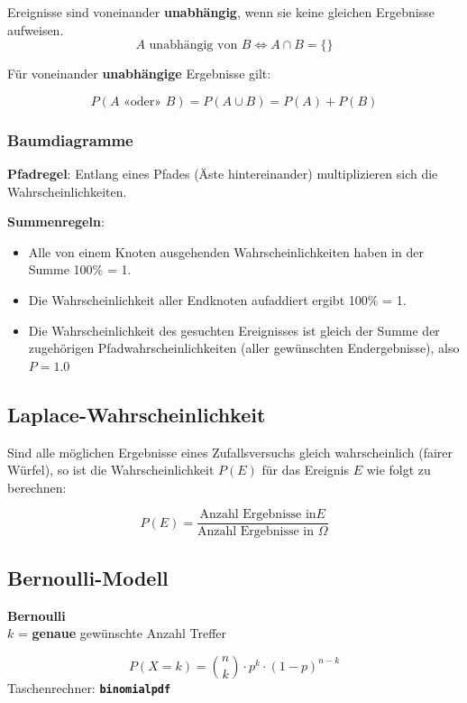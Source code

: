 \begin{multicols}{2}
Ereignisse sind voneinander \textbf{unabhängig}, wenn sie keine
gleichen Ergebnisse aufweisen.
$$A \textrm{ unabhängig von } B \Leftrightarrow A\cap B=\{\}$$

Für voneinander \textbf{unabhängige} Ergebnisse 
gilt:

$$P(A\textrm{ «oder» }B) = P(A\cup B) = P(A) + P(B)$$

\forceCB
\subsubsection*{Baumdiagramme}

\textbf{Pfadregel}:
Entlang eines Pfades (Äste hintereinander) multiplizieren sich die
Wahrscheinlichkeiten.

\textbf{Summenregeln}:
\begin{itemize}
\item Alle von einem Knoten ausgehenden Wahrscheinlichkeiten haben in
  der Summe 100\% = 1.

\item Die Wahrscheinlichkeit aller Endknoten aufaddiert ergibt
100\% = 1.
  
\item Die Wahrscheinlichkeit des gesuchten Ereignisses ist gleich der
Summe der zugehörigen Pfadwahrscheinlichkeiten (aller gewünschten
Endergebnisse), also $P=1.0$
\end{itemize}


\subsection*{Laplace-Wahrscheinlichkeit}
Sind alle möglichen Ergebnisse eines Zufallsversuchs gleich
wahrscheinlich (fairer Würfel), so ist die Wahrscheinlichkeit $P(E)$ für das Ereignis
$E$ wie folgt zu berechnen:

$$P(E) = \frac{\textrm{Anzahl Ergebnisse in
}E}{\textrm{Anzahl Ergebnisse in }\Omega}$$


\subsection*{Bernoulli-Modell}

\begin{tcolorbox}[colback=white]
\textbf{Bernoulli}\\
$k$ = \textbf{genaue} gewünschte Anzahl Treffer

$$P(X=k) = {n \choose k}\cdot{}p^k\cdot{}(1-p)^{n-k}$$
Taschenrechner:  \textbf{\texttt{binomialpdf}}


\end{tcolorbox}
\end{multicols}
